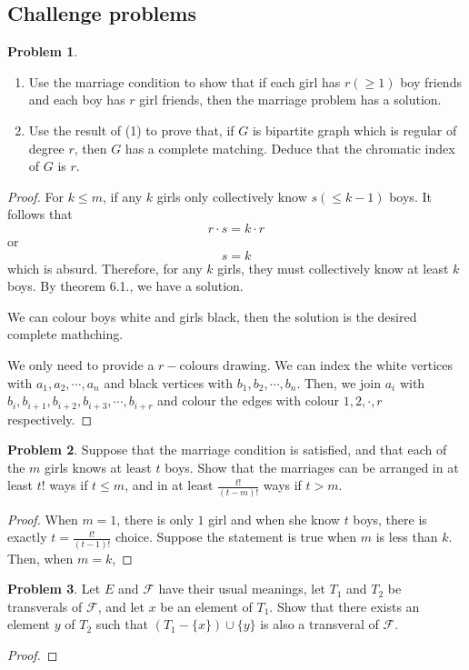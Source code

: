 \documentclass[a4paper,11pt]{article}%
\theoremstyle{remark}
\theoremstyle{definition}
\newtheorem{problem}{Problem}[subsection]
\begin{document}
\subsection{Challenge problems}
\begin{problem}
    \begin{enumerate}
        \item Use the marriage condition to show that if each girl has $r(\geq 1)$ boy friends and each boy has $r$ girl friends, then 
        the marriage problem has a solution.
        \item Use the result of (1) to prove that, if $G$ is bipartite graph which is regular of degree $r$, then $G$ has a complete matching.
        Deduce that the chromatic index of $G$ is $r$.
    \end{enumerate}
    \begin{proof}
       For $k\leq m$, if any $k$ girls only collectively know $s(\leq k-1)$ boys. It follows that 
       \[r\cdot s=k\cdot r\] 
       or 
       \[s=k\]
       which is absurd.
       Therefore, for any $k$ girls, they must collectively know at least $k$ boys. By theorem 6.1., we have a solution.

       We can colour boys white and girls black, then the solution is the desired complete mathching.

       We only need to provide a $r-$colours drawing.
       We can index the white vertices with $a_1,a_2,\cdots,a_n$ and black vertices with $b_1,b_2,\cdots,b_n$.
       Then, we join $a_i$ with $b_i,b_{i+1},b_{i+2},b_{i+3},\cdots,b_{i+r}$ and colour the edges with colour $1,2,\cdot,r$
       respectively.
    \end{proof}
\end{problem}
\begin{problem}
    Suppose that the marriage condition is satisfied, and that each of the $m$ girls knows at 
    least $t$ boys. Show that the marriages can be arranged in at least $t!$ ways if $t\leq m$, and 
    in at least $\frac{t!}{(t-m)!}$ ways if $t>m$. 
    \begin{proof}
       When $m=1$, there is only $1$ girl and when she know $t$ boys, there is exactly $t=\frac{t!}{(t-1)!}$ choice.
       Suppose the statement is true when $m$ is less than $k$. Then, when $m=k$, 
    \end{proof}
\end{problem}
\begin{problem}
    Let $E$ and $\mathcal{F}$ have their usual meanings, let $T_1$ and $T_2$ be transverals of $\mathcal{F}$, 
    and let $x$ be an element of $T_1$. Show that there exists an element $y$ of $T_2$ such that $(T_1-\{x\})\cup\{y\}$
    is also a transveral of $\mathcal{F}$.
    \begin{proof}
    \end{proof}
\end{problem}
\end{document}
